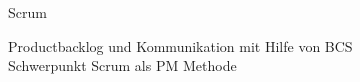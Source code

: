 
\begin{frame}[c]{Scrum}

  \begin{center}
    Productbacklog und Kommunikation mit Hilfe von BCS
    \\ Schwerpunkt Scrum als PM Methode
  \end{center}

\end{frame}
